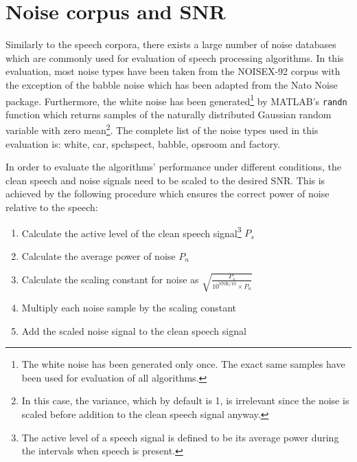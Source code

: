 
\section{Noise corpus and SNR}

Similarly to the speech corpora, there exists a large number of noise databases which are commonly used for evaluation of speech processing algorithms. In this evaluation, most noise types have been taken from the NOISEX-92 \cite{NOISEX} corpus with the exception of the babble noise which has been adapted from the Nato Noise \cite{Nato} package. Furthermore, the white noise has been generated\footnote{The white noise has been generated only once. The exact same samples have been used for evaluation of all algorithms.} by MATLAB's \texttt{randn} function which returns samples of the naturally distributed Gaussian random variable with zero mean\footnote{In this case, the variance, which by default is 1, is irrelevant since the noise is scaled before addition to the clean speech signal anyway.}. The complete list of the noise types used in this evaluation is: white, car, spchspect, babble, opsroom and factory.

In order to evaluate the algorithms' performance under different conditions, the clean speech and noise signals need to be scaled to the desired SNR. This is achieved by the following procedure which ensures the correct power of noise relative to the speech:

\begin{enumerate}
\item Calculate the active level of the clean speech signal\footnote{The active level of a speech signal is defined to be its average power during the intervals when speech is present.} $P_s$
\item Calculate the average power of noise $P_n$
\item Calculate the scaling constant for noise as $\sqrt{\frac{P_s}{10^{\text{SNR}/10} \times P_n}}$
\item Multiply each noise sample by the scaling constant
\item Add the scaled noise signal to the clean speech signal
\end{enumerate}


